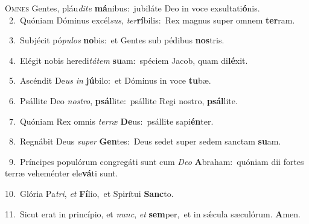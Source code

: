 \lettrine{\initial\textcolor{\initialcolor}{O}}{mnes} Gentes, pláu\-\textit{di}\-\textit{te} \textbf{má}\-nibus:~\star jubiláte Deo in voce exsultati\-\textbf{ó}\-nis.\\
{\numbfont\textcolor{\numbcolor}{~2.}}~Quóniam Dóminus excél\-\textit{sus}\-, \textit{ter}\-\textbf{rí}bilis:~\star Rex magnus super omnem \textbf{ter}\-ram.\par
{\numbfont\textcolor{\numbcolor}{~3.}}~Subjécit pó\-\textit{pu}\-\textit{los} \textbf{no}\-bis:~\star et Gentes sub pédibus \textbf{nos}\-tris.\par
{\numbfont\textcolor{\numbcolor}{~4.}}~Elégit nobis heredi\-\textit{tá}\-\textit{tem} \textbf{su}\-am:~\star spéciem Jacob, quam di\-\textbf{lé}\-xit.\par
{\numbfont\textcolor{\numbcolor}{~5.}}~Ascéndit De\textit{us} \textit{in} \textbf{jú}\-bilo:~\star et Dóminus in voce \textbf{tu}\-bæ.\par
{\numbfont\textcolor{\numbcolor}{~6.}}~Psállite Deo \textit{nos}\-\textit{tro}, \textbf{psál}\-lite:~\star psállite Regi nostro, \textbf{psál}\-lite.\par
{\numbfont\textcolor{\numbcolor}{~7.}}~Quóniam Rex omnis \textit{ter}\-\textit{ræ} \textbf{De}\-us:~\star psállite sapi\-\textbf{én}\-ter.\par
{\numbfont\textcolor{\numbcolor}{~8.}}~Regnábit Deus \textit{su}\-\textit{per} \textbf{Gen}\-tes:~\star Deus sedet super sedem sanctam \textbf{su}\-am.\par
{\numbfont\textcolor{\numbcolor}{~9.}}~Príncipes populórum congregáti sunt cum \textit{De}\-\textit{o} \textbf{A}\-braham:~\star quóniam dii fortes terræ veheménter ele\-\textbf{vá}\-ti sunt.\par
{\numbfont\textcolor{\numbcolor}{10.}}~Glória Pa\-\textit{tri}\-, \textit{et} \textbf{Fí}\-lio,~\star et Spirítui \textbf{Sanc}\-to.\par
{\numbfont\textcolor{\numbcolor}{11.}}~Sicut erat in princípio, et \textit{nunc}\-, \textit{et} \textbf{sem}\-per,~\star et in sǽcula sæculórum. \textbf{A}\-men.\par
